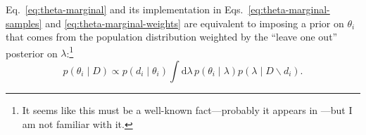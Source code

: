 \documentclass[modern]{aastex63}
\newcommand{\dd}{\ensuremath{\mathrm{d}}}
\begin{document}
Eq.\ \eqref{eq:theta-marginal} and its implementation in Eqs.\
\eqref{eq:theta-marginal-samples} and \eqref{eq:theta-marginal-weights} are
equivalent to imposing a prior on $\theta_i$ that comes from the population
distribution weighted by the ``leave one out'' posterior on
$\lambda$:\footnote{It seems like this must be a well-known fact---probably it
appears in \citet{Gelman2013}---but I am not familiar with it.}
%
\begin{equation}
  p\left( \theta_i \mid D \right) \propto p\left( d_i \mid \theta_i \right) \int \dd \lambda \, p\left( \theta_i \mid \lambda \right) p\left( \lambda \mid D \backslash d_i \right).
\end{equation}
%

\clearpage


\end{document}
